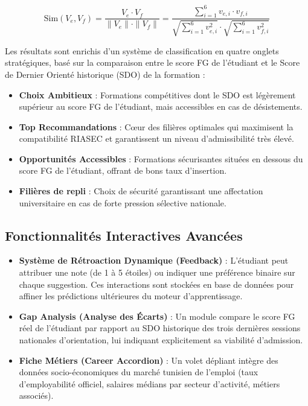 \begin{equation}
\text{Sim}(V_e, V_f) = \frac{V_e \cdot V_f}{\|V_e\| \cdot \|V_f\|} = \frac{\sum_{i=1}^6 v_{e,i} \cdot v_{f,i}}{\sqrt{\sum_{i=1}^6 v_{e,i}^2} \cdot \sqrt{\sum_{i=1}^6 v_{f,i}^2}}
\label{eq:cosine}
\end{equation}

Les résultats sont enrichis d'un système de classification en quatre onglets stratégiques, basé sur la comparaison entre le score FG de l'étudiant et le Score de Dernier Orienté historique (SDO) de la formation :
\begin{itemize}
    \item \textbf{Choix Ambitieux} : Formations compétitives dont le SDO est légèrement supérieur au score FG de l'étudiant, mais accessibles en cas de désistements.
    \item \textbf{Top Recommandations} : Cœur des filières optimales qui maximisent la compatibilité RIASEC et garantissent un niveau d'admissibilité très élevé.
    \item \textbf{Opportunités Accessibles} : Formations sécurisantes situées en dessous du score FG de l'étudiant, offrant de bons taux d'insertion.
    \item \textbf{Filières de repli} : Choix de sécurité garantissant une affectation universitaire en cas de forte pression sélective nationale.
\end{itemize}

\subsection{Fonctionnalités Interactives Avancées}

\begin{itemize}
    \item \textbf{Système de Rétroaction Dynamique (Feedback)} : L'étudiant peut attribuer une note (de 1 à 5 étoiles) ou indiquer une préférence binaire sur chaque suggestion. Ces interactions sont stockées en base de données pour affiner les prédictions ultérieures du moteur d'apprentissage.
    \item \textbf{Gap Analysis (Analyse des Écarts)} : Un module compare le score FG réel de l'étudiant par rapport au SDO historique des trois dernières sessions nationales d'orientation, lui indiquant explicitement sa viabilité d'admission.
    \item \textbf{Fiche Métiers (Career Accordion)} : Un volet dépliant intègre des données socio-économiques du marché tunisien de l'emploi (taux d'employabilité officiel, salaires médians par secteur d'activité, métiers associés).
\end{itemize}

